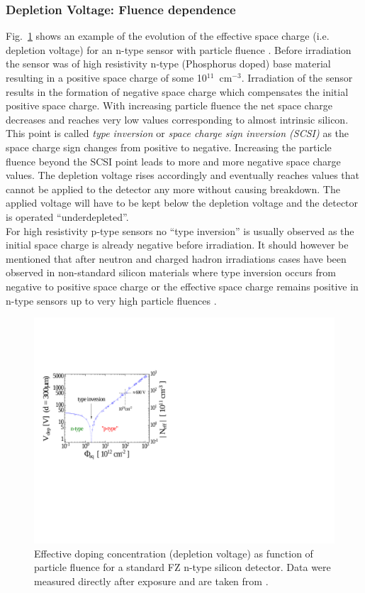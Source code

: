 \subsubsection*{Depletion Voltage: Fluence dependence}
\label{sec:vdep_phi}
 Fig.~\ref{fig:1999-Moll-phd-basic-vdep-phi} shows an example of the evolution of the effective space charge (i.e. depletion voltage) for an n-type sensor with particle fluence \cite{1992-Wunstorf-phd}. Before irradiation the sensor was of high resistivity n-type (Phosphorus doped) base material resulting in a positive space charge of some 10$^{11}$~cm$^{-3}$.
Irradiation of the sensor results in the formation of negative space charge which compensates the initial positive space charge. With increasing particle fluence the net space charge decreases and reaches very low values corresponding to almost intrinsic silicon. 
 This point is called {\em type inversion} or {\em space charge sign inversion (SCSI)} as the space charge sign changes from positive to negative. Increasing the particle fluence beyond the SCSI point leads to more and more negative space charge values. The depletion voltage rises accordingly and eventually reaches values that cannot be applied to the detector any more without causing breakdown. The applied voltage will have to be kept below the depletion voltage and the detector is operated  “underdepleted”. \\
For high resistivity p-type sensors no “type inversion” is usually observed as the initial space charge is already negative before irradiation. It should however be mentioned that after neutron and charged hadron irradiations cases have been observed in non-standard silicon materials where type inversion occurs from negative to positive space charge \cite{1999-Moll-phd} or the effective space charge remains positive in n-type sensors up to very high particle fluences \cite{2006-Lindstrom-epi, 2011-Pacifico-mcz}.   
\begin{figure}[bth]
\centering
\includegraphics[width=0.6\linewidth]{figures/RadiationEffects/Sensors/1999-Moll-phd-basic-vdep-phi.pdf}
\caption{
Effective doping concentration (depletion voltage) as function of particle fluence for a standard FZ n-type silicon detector. Data were measured directly after exposure and are taken from \cite{1992-Wunstorf-phd}.}
\label{fig:1999-Moll-phd-basic-vdep-phi}
\end{figure}
